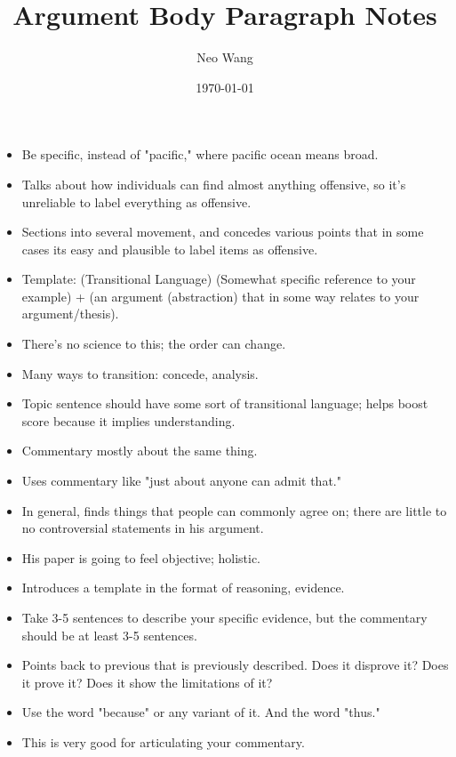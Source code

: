 \documentclass{article}
\title{Argument Body Paragraph Notes}
\author{Neo Wang}
\date{\today}
\begin{document}
\maketitle

\begin{itemize}
    \item Be specific, instead of "pacific," where pacific ocean means broad.
    \item Talks about how individuals can find almost anything offensive, so it's unreliable to label everything as offensive.
    \item Sections into several movement, and concedes various points that in some cases its easy and plausible to label items as offensive.
    \item Template: (Transitional Language) (Somewhat specific reference to your example) + (an argument (abstraction) that in some way relates to your argument/thesis).
    \item There's no science to this; the order can change.
    \item Many ways to transition: concede, analysis.
    \item Topic sentence should have some sort of transitional language; helps boost score because it implies understanding.
    \item Commentary mostly about the same thing.
    \item Uses commentary like "just about anyone can admit that."
    \item In general, finds things that people can commonly agree on; there are little to no controversial statements in his argument.
    \item His paper is going to feel objective; holistic.
    \item Introduces a template in the format of reasoning, evidence.
    \item Take 3-5 sentences to describe your specific evidence, but the commentary should be at least 3-5 sentences.
    \item Points back to previous that is previously described. Does it disprove it? Does it prove it? Does it show the limitations of it?
    \item Use the word "because" or any variant of it. And the word "thus."
    \item This is very good for articulating your commentary.
\end{itemize}
\end{document}
